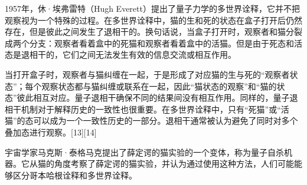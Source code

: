 1957年，休·埃弗雷特（Hugh Everett）提出了量子力学的多世界诠释，它并不把观察视为一个特殊的过程。在多世界诠释中，猫的生和死的状态在盒子打开后仍然存在，但是彼此之间发生了退相干的。换句话说，当盒子打开时，观察者和猫分裂成两个分支：观察者看着盒中的死猫和观察者看着盒中的活猫。但是由于死态和活态是退相干的，它们之间无法发生有效的信息交流或相互作用。

当打开盒子时，观察者与猫纠缠在一起，于是形成了对应猫的生与死的“观察者状态”；每个观察状态都与猫纠缠或联系在一起，因此“猫状态的观察”和“猫的状态”彼此相互对应。量子退相干确保不同的结果间没有相互作用。同样的，量子退相干机制对于解释历史的一致性也很重要。在多世界诠释中，只有“死猫”或“活猫”的态可以成为一个一致性历史的一部分。退相干通常被认为避免了同时对多个叠加态进行观察。[13][14]

宇宙学家马克斯·泰格马克提出了薛定谔的猫实验的一个变体，称为量子自杀机器。它从猫的角度考察了薛定谔的猫实验，并认为通过使用这种方法，人们可能能够区分哥本哈根诠释和多世界诠释。